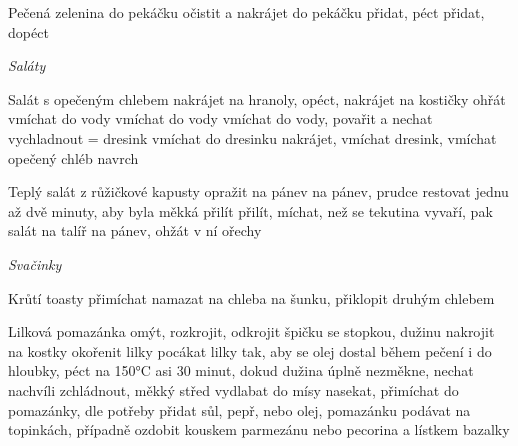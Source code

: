 \documentclass[12pt,a4paper]{article}
\begin{document}
\begin{recipe}{Pečená zelenina}
   do pekáčku
   očistit a nakrájet do pekáčku
   přidat, péct
   přidat, dopéct
\end{recipe}
\newpage

\vspace*{\fill}
\hfill {\Huge\it Saláty}\hfill
\vspace*{\fill}
\newpage

\begin{recipe}{Salát s opečeným chlebem}
   nakrájet na hranoly, opéct, nakrá\-jet na kostičky
   ohřát
   vmíchat do vody
   vmíchat do vody
   vmíchat do vody, povařit a nechat vychladnout = dresink
   vmíchat do dresinku
   nakrájet, vmíchat dresink, vmíchat ope\-če\-ný chléb
   navrch
\end{recipe}
\newpage

\begin{recipe}{Teplý salát z růžičkové kapusty}
   opražit
   na pánev
   na pánev, prudce restovat jednu až dvě minuty, aby byla měkká
   přilít
   přilít, míchat, než se tekutina vyvaří, pak salát na talíř
   na pánev, ohžát v ní ořechy
\end{recipe}
\newpage

\vspace*{\fill}
\hfill {\Huge\it Svačinky}\hfill
\vspace*{\fill}
\newpage

\begin{recipe}{Krůtí toasty}
   přimíchat
   namazat
   na chleba
   na šunku, přiklopit druhým chlebem
\end{recipe}
\newpage

\begin{recipe}{Lilková pomazánka}
   omýt, rozkrojit, odkrojit špičku se stopkou, dužinu nakrojit na kostky
   okořenit lilky
   pocákat lilky tak, aby se olej dostal během pečení i do hloubky, péct na 150°C asi 30 minut, dokud dužina úplně nezměkne, nechat nachvíli zchládnout,
     měkký střed vydlabat do mísy
   nasekat, přimíchat do pomazánky, dle potřeby přidat sůl, pepř, nebo olej, pomazánku podávat na topinkách, případně ozdobit kouskem parmezánu nebo
    pecorina a lístkem bazalky
\end{recipe}
\newpage
\end{document}
